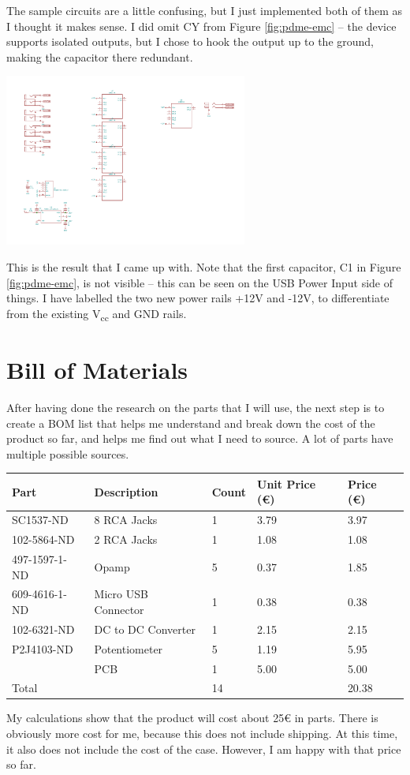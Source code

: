 \documentclass[a4paper]{article}
\begin{document}
The sample circuits are a little confusing, but I just implemented both of them as I thought it makes sense. I did omit CY from Figure \ref{fig:pdme-emc} -- the device supports isolated outputs, but I chose to hook the output up to the ground, making the capacitor there redundant.

\begin{center}
  \includegraphics[trim={2cm 1.5cm 21cm 16cm},width=8cm,clip]{images/audio-mixer.pdf}
\end{center}

This is the result that I came up with. Note that the first capacitor, C1 in Figure \ref{fig:pdme-emc}, is not visible -- this can be seen on the USB Power Input side of things. I have labelled the two new power rails +12V and -12V, to differentiate from the existing V\textsubscript{cc} and GND rails.

\section{Bill of Materials}

After having done the research on the parts that I will use, the next step is to create a BOM list that helps me understand and break down the cost of the product so far, and helps me find out what I need to source. A lot of parts have multiple possible sources.

\begin{table}[h!]
\centering
\begin{tabular}{@{}lllll@{}}
\toprule
Part & Description & Count & Unit Price (€) & Price (€)\\
\midrule
SC1537-ND & 8 RCA Jacks & 1 & 3.79 & 3.97\\
102-5864-ND & 2 RCA Jacks & 1 & 1.08 & 1.08\\
497-1597-1-ND & Opamp & 5 & 0.37 & 1.85\\
609-4616-1-ND & Micro USB Connector & 1 & 0.38 & 0.38\\
102-6321-ND & DC to DC Converter & 1 & 2.15 & 2.15\\
P2J4103-ND & Potentiometer & 5 & 1.19 & 5.95\\
& PCB & 1 & 5.00 & 5.00\\
\midrule
Total & & 14 && 20.38\\
\bottomrule
\end{tabular}
\end{table}

My calculations show that the product will cost about 25€ in parts. There is obviously more cost for me, because this does not include shipping. At this time, it also does not include the cost of the case. However, I am happy with that price so far. 
\end{document}
